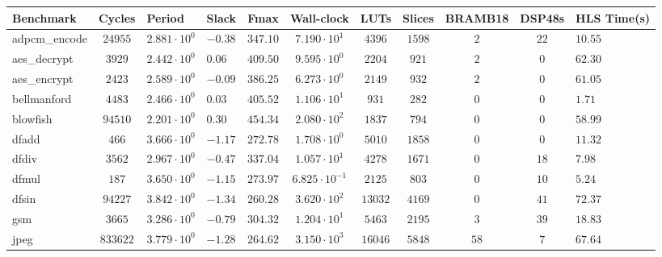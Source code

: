 \begin{tabular}{|l|c|HHc|c|c|c|c|cH|}
\hline
Benchmark     & Cycles       & Period                 & Slack     & Fmax       & Wall-clock              & LUTs      & Slices    & BRAMB18 & DSP48s  & HLS Time(s) \\
\hline
adpcm\_encode & $ 24955    $ & $ 2.881 \cdot 10^{0} $ & $ -0.38 $ & $ 347.10 $ & $ 7.190 \cdot 10^{1}  $ & $ 4396  $ & $ 1598  $ & $ 2   $ & $ 22  $ & $ 10.55   $ \\
aes\_decrypt  & $ 3929     $ & $ 2.442 \cdot 10^{0} $ & $ 0.06  $ & $ 409.50 $ & $ 9.595 \cdot 10^{0}  $ & $ 2204  $ & $ 921   $ & $ 2   $ & $ 0   $ & $ 62.30   $ \\
aes\_encrypt  & $ 2423     $ & $ 2.589 \cdot 10^{0} $ & $ -0.09 $ & $ 386.25 $ & $ 6.273 \cdot 10^{0}  $ & $ 2149  $ & $ 932   $ & $ 2   $ & $ 0   $ & $ 61.05   $ \\
bellmanford   & $ 4483     $ & $ 2.466 \cdot 10^{0} $ & $ 0.03  $ & $ 405.52 $ & $ 1.106 \cdot 10^{1}  $ & $ 931   $ & $ 282   $ & $ 0   $ & $ 0   $ & $ 1.71    $ \\
blowfish      & $ 94510    $ & $ 2.201 \cdot 10^{0} $ & $ 0.30  $ & $ 454.34 $ & $ 2.080 \cdot 10^{2}  $ & $ 1837  $ & $ 794   $ & $ 0   $ & $ 0   $ & $ 58.99   $ \\
dfadd         & $ 466      $ & $ 3.666 \cdot 10^{0} $ & $ -1.17 $ & $ 272.78 $ & $ 1.708 \cdot 10^{0}  $ & $ 5010  $ & $ 1858  $ & $ 0   $ & $ 0   $ & $ 11.32   $ \\
dfdiv         & $ 3562     $ & $ 2.967 \cdot 10^{0} $ & $ -0.47 $ & $ 337.04 $ & $ 1.057 \cdot 10^{1}  $ & $ 4278  $ & $ 1671  $ & $ 0   $ & $ 18  $ & $ 7.98    $ \\
dfmul         & $ 187      $ & $ 3.650 \cdot 10^{0} $ & $ -1.15 $ & $ 273.97 $ & $ 6.825 \cdot 10^{-1} $ & $ 2125  $ & $ 803   $ & $ 0   $ & $ 10  $ & $ 5.24    $ \\
dfsin         & $ 94227    $ & $ 3.842 \cdot 10^{0} $ & $ -1.34 $ & $ 260.28 $ & $ 3.620 \cdot 10^{2}  $ & $ 13032 $ & $ 4169  $ & $ 0   $ & $ 41  $ & $ 72.37   $ \\
gsm           & $ 3665     $ & $ 3.286 \cdot 10^{0} $ & $ -0.79 $ & $ 304.32 $ & $ 1.204 \cdot 10^{1}  $ & $ 5463  $ & $ 2195  $ & $ 3   $ & $ 39  $ & $ 18.83   $ \\
jpeg          & $ 833622   $ & $ 3.779 \cdot 10^{0} $ & $ -1.28 $ & $ 264.62 $ & $ 3.150 \cdot 10^{3}  $ & $ 16046 $ & $ 5848  $ & $ 58  $ & $ 7   $ & $ 67.64   $ \\

\end{tabular}
